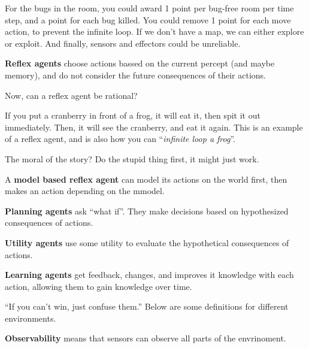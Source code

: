 \begin{eg}
	For the bugs in the room, you could award 1 point per bug-free room per time step, and a point for each bug killed. You could remove 1 point for each move action, to prevent the infinite loop. If we don't have a map, we can either explore or exploit. And finally, sensors and effectors could be unreliable.
\end{eg}

\begin{definition}
	\textbf{Reflex agents} choose actions bassed on the current percept (and maybe memory), and do not consider the future consequences of their actions.
\end{definition}

Now, can a reflex agent be rational?

\begin{eg}
	If you put a cranberry in front of a frog, it will eat it, then spit it out immediately. Then, it will see the cranberry, and eat it again. This is an example of a reflex agent, and is also how you can ``\textit{infinite loop a frog}''.
\end{eg}

The moral of the story? Do the stupid thing first, it might just work.

\begin{definition}
	A \textbf{model based reflex agent} can model its actions on the world first, then makes an action depending on the mmodel.
\end{definition}

\begin{definition}
	\textbf{Planning agents} ask ``what if''. They make decisions based on hypothesized consequences of actions.
\end{definition}

\begin{definition}
	\textbf{Utility agents} use some utility to evaluate the hypothetical consequences of actions.
\end{definition}

\begin{definition}
	\textbf{Learning agents} get feedback, changes, and improves it knowledge with each action, allowing them to gain knowledge over time.
\end{definition}

``If you can't win, just confuse them.'' Below are some definitions for different environments.

\begin{definition}
	\textbf{Observability} means that sensors can observe all parts of the envrinoment.
\end{definition}

